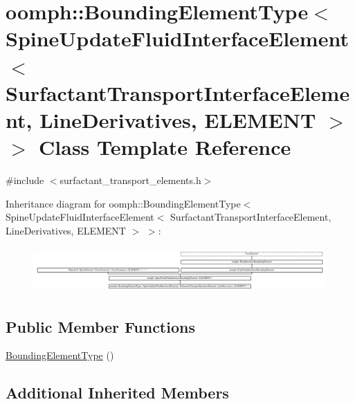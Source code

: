 \hypertarget{classoomph_1_1BoundingElementType_3_01SpineUpdateFluidInterfaceElement_3_01SurfactantTransportIn1a79ed5e636f8826f4a8a00ba9f037b4}{}\section{oomph\+:\+:Bounding\+Element\+Type$<$ Spine\+Update\+Fluid\+Interface\+Element$<$ Surfactant\+Transport\+Interface\+Element, Line\+Derivatives, E\+L\+E\+M\+E\+NT $>$ $>$ Class Template Reference}
\label{classoomph_1_1BoundingElementType_3_01SpineUpdateFluidInterfaceElement_3_01SurfactantTransportIn1a79ed5e636f8826f4a8a00ba9f037b4}


{\ttfamily \#include $<$surfactant\+\_\+transport\+\_\+elements.\+h$>$}

Inheritance diagram for oomph\+:\+:Bounding\+Element\+Type$<$ Spine\+Update\+Fluid\+Interface\+Element$<$ Surfactant\+Transport\+Interface\+Element, Line\+Derivatives, E\+L\+E\+M\+E\+NT $>$ $>$\+:\begin{figure}[H]
\begin{center}
\leavevmode
\includegraphics[height=1.752190cm]{classoomph_1_1BoundingElementType_3_01SpineUpdateFluidInterfaceElement_3_01SurfactantTransportIn1a79ed5e636f8826f4a8a00ba9f037b4}
\end{center}
\end{figure}
\subsection*{Public Member Functions}
\begin{DoxyCompactItemize}
\item 
\hyperlink{classoomph_1_1BoundingElementType_3_01SpineUpdateFluidInterfaceElement_3_01SurfactantTransportIn1a79ed5e636f8826f4a8a00ba9f037b4_a101abb5e7f32b95198b31e5dd6a6a1d0}{Bounding\+Element\+Type} ()
\end{DoxyCompactItemize}
\subsection*{Additional Inherited Members}


